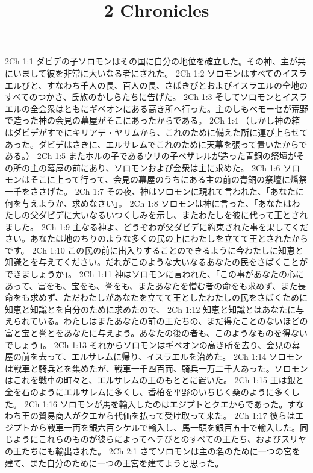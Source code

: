 

\title{2 Chronicles}

2Ch 1:1  ダビデの子ソロモンはその国に自分の地位を確立した。その神、主が共にいまして彼を非常に大いなる者にされた。
2Ch 1:2  ソロモンはすべてのイスラエルびと、すなわち千人の長、百人の長、さばきびとおよびイスラエルの全地のすべてのつかさ、氏族のかしらたちに告げた。
2Ch 1:3  そしてソロモンとイスラエルの全会衆はともにギベオンにある高き所へ行った。主のしもべモーセが荒野で造った神の会見の幕屋がそこにあったからである。
2Ch 1:4  （しかし神の箱はダビデがすでにキリアテ・ヤリムから、これのために備えた所に運び上らせてあった。ダビデはさきに、エルサレムでこれのために天幕を張って置いたからである。）
2Ch 1:5  またホルの子であるウリの子ベザレルが造った青銅の祭壇がその所の主の幕屋の前にあり、ソロモンおよび会衆は主に求めた。
2Ch 1:6  ソロモンはそこに上って行って、会見の幕屋のうちにある主の前の青銅の祭壇に燔祭一千をささげた。
2Ch 1:7  その夜、神はソロモンに現れて言われた、「あなたに何を与えようか、求めなさい」。
2Ch 1:8  ソロモンは神に言った、「あなたはわたしの父ダビデに大いなるいつくしみを示し、またわたしを彼に代って王とされました。
2Ch 1:9  主なる神よ、どうぞわが父ダビデに約束された事を果してください。あなたは地のちりのような多くの民の上にわたしを立てて王とされたからです。
2Ch 1:10  この民の前に出入りすることのできるように今わたしに知恵と知識とを与えてください。だれがこのような大いなるあなたの民をさばくことができましょうか」。
2Ch 1:11  神はソロモンに言われた、「この事があなたの心にあって、富をも、宝をも、誉をも、またあなたを憎む者の命をも求めず、また長命をも求めず、ただわたしがあなたを立てて王としたわたしの民をさばくために知恵と知識とを自分のために求めたので、
2Ch 1:12  知恵と知識とはあなたに与えられている。わたしはまたあなたの前の王たちの、まだ得たことのないほどの富と宝と誉とをあなたに与えよう。あなたの後の者も、このようなものを得ないでしょう」。
2Ch 1:13  それからソロモンはギベオンの高き所を去り、会見の幕屋の前を去って、エルサレムに帰り、イスラエルを治めた。
2Ch 1:14  ソロモンは戦車と騎兵とを集めたが、戦車一千四百両、騎兵一万二千人あった。ソロモンはこれを戦車の町々と、エルサレムの王のもととに置いた。
2Ch 1:15  王は銀と金を石のようにエルサレムに多くし、香柏を平野のいちじく桑のように多くした。
2Ch 1:16  ソロモンが馬を輸入したのはエジプトとクエからであった。すなわち王の貿易商人がクエから代価を払って受け取って来た。
2Ch 1:17  彼らはエジプトから戦車一両を銀六百シケルで輸入し、馬一頭を銀百五十で輸入した。同じようにこれらのものが彼らによってヘテびとのすべての王たち、およびスリヤの王たちにも輸出された。
2Ch 2:1  さてソロモンは主の名のために一つの宮を建て、また自分のために一つの王宮を建てようと思った。
